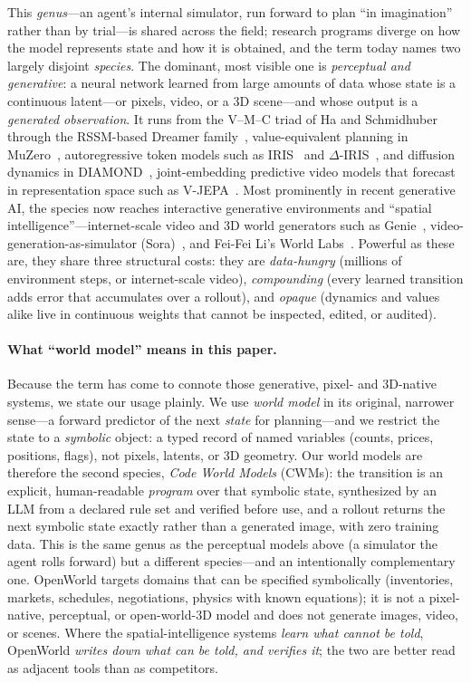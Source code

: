 \documentclass[11pt]{article}
\begin{document}
This \emph{genus}---an agent's internal simulator, run forward to plan ``in
imagination'' rather than by trial---is shared across the field; research programs
diverge on how the model represents state and how it is obtained, and the
term today names two largely disjoint \emph{species}. The dominant, most visible one is \emph{perceptual and
generative}: a neural network learned from large amounts of data whose state is a
continuous latent---or pixels, video, or a 3D scene---and whose output is a
\emph{generated observation}. It runs from the V--M--C triad of Ha and
Schmidhuber~\cite{ha2018world} through the RSSM-based Dreamer
family~\cite{dreamerv3}, value-equivalent planning in MuZero~\cite{muzero},
autoregressive token models such as IRIS~\cite{iris2023} and
$\Delta$-IRIS~\cite{deltairis2024}, and diffusion dynamics in
DIAMOND~\cite{diamond2024}, joint-embedding predictive video models that
forecast in representation space such as V-JEPA~\cite{vjepa2025}. Most
prominently in recent generative AI, the species now reaches interactive generative
environments and ``spatial intelligence''---internet-scale video and 3D world
generators such as Genie~\cite{genie2024}, video-generation-as-simulator
(Sora)~\cite{sora2024}, and Fei-Fei Li's World Labs~\cite{worldlabs2025}. Powerful as these are, they share three structural
costs: they are \emph{data-hungry} (millions of environment steps, or
internet-scale video), \emph{compounding} (every learned transition adds error
that accumulates over a rollout), and \emph{opaque} (dynamics and values alike
live in continuous weights that cannot be inspected, edited, or audited).

\paragraph{What ``world model'' means in this paper.} Because the term has come to
connote those generative, pixel- and 3D-native systems, we state our usage plainly.
We use \emph{world model} in its original, narrower sense---a forward predictor of
the next \emph{state} for planning---and we restrict the state to a \emph{symbolic}
object: a typed record of named variables (counts, prices, positions, flags), not
pixels, latents, or 3D geometry. Our world models are therefore the second species,
\emph{Code World Models} (CWMs): the transition is an explicit, human-readable
\emph{program} over that symbolic state, synthesized by an LLM from a declared rule
set and verified before use, and a rollout returns the next symbolic state
exactly rather than a generated image, with zero training data. This
is the same genus as the perceptual models above (a simulator the agent rolls
forward) but a different species---and an intentionally complementary one.
OpenWorld targets domains that can be specified symbolically (inventories,
markets, schedules, negotiations, physics with known equations); it is not a
pixel-native, perceptual, or open-world-3D model and does not generate images,
video, or scenes. Where the spatial-intelligence systems \emph{learn what cannot be
told}, OpenWorld \emph{writes down what can be told, and verifies it}; the two are
better read as adjacent tools than as competitors.
\end{document}
